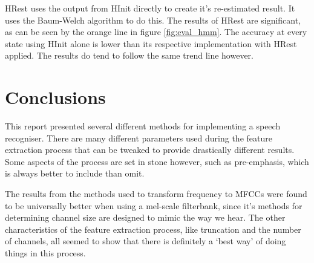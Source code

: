 \documentclass[journal]{IEEEtran}
\begin{document}
	HRest uses the output from HInit directly to create it's re-estimated result. It uses the Baum-Welch algorithm to do this. The results of HRest are significant, as can be seen by the orange line in figure \ref{fig:eval_hmm}. The accuracy at every state using HInit alone is lower than its respective implementation with HRest applied. The results do tend to follow the same trend line however.

\section{Conclusions}
This report presented several different methods for implementing a speech recogniser. There are many different parameters used during the feature extraction process that can be tweaked to provide drastically different results. Some aspects of the process are set in stone however, such as pre-emphasis, which is always better to include than omit. 

The results from the methods used to transform frequency to MFCCs were found to be universally better when using a mel-scale filterbank, since it's methods for determining channel size are designed to mimic the way we hear. The other characteristics of the feature extraction process, like truncation and the number of channels, all seemed to show that there is definitely a `best way' of doing things in this process.


 
\end{document}

